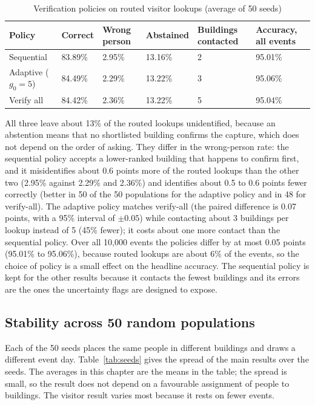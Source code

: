\documentclass[12pt,a4paper,oneside]{report}
\begin{document}
\begin{table}[htbp]
\centering
\caption{Verification policies on routed visitor lookups (average of 50 seeds)}\label{tab:policies}
{\small\setlength{\tabcolsep}{4pt}\renewcommand{\arraystretch}{1.2}
\begin{tabular}{|p{3.3cm}|p{1.9cm}|p{2.2cm}|p{2.0cm}|p{2.3cm}|p{2.2cm}|}\hline
\textbf{Policy} & \textbf{Correct} & \textbf{Wrong person} & \textbf{Abstained} & \textbf{Buildings contacted} & \textbf{Accuracy, all events}\\\hline
Sequential & 83.89\% & 2.95\% & 13.16\% & 2 & 95.01\%\\\hline
Adaptive ($g_0=5$) & 84.49\% & 2.29\% & 13.22\% & 3 & 95.06\%\\\hline
Verify all & 84.42\% & 2.36\% & 13.22\% & 5 & 95.04\%\\\hline
\end{tabular}}
\end{table}

All three leave about 13\% of the routed lookups unidentified, because an abstention means that no shortlisted building confirms the capture, which does not depend on the order of asking. They differ in the wrong-person rate: the sequential policy accepts a lower-ranked building that happens to confirm first, and it misidentifies about 0.6 points more of the routed lookups than the other two (2.95\% against 2.29\% and 2.36\%) and identifies about 0.5 to 0.6 points fewer correctly (better in 50 of the 50 populations for the adaptive policy and in 48 for verify-all). The adaptive policy matches verify-all (the paired difference is 0.07 points, with a 95\% interval of $\pm0.05$) while contacting about 3 buildings per lookup instead of 5 (45\% fewer); it costs about one more contact than the sequential policy. Over all 10,000 events the policies differ by at most 0.05 points (95.01\% to 95.06\%), because routed lookups are about 6\% of the events, so the choice of policy is a small effect on the headline accuracy. The sequential policy is kept for the other results because it contacts the fewest buildings and its errors are the ones the uncertainty flags are designed to expose.

\subsection{Stability across 50 random populations}\label{sec:res-seeds}
Each of the 50 seeds places the same people in different buildings and draws a different event day. Table~\ref{tab:seeds} gives the spread of the main results over the seeds. The averages in this chapter are the means in the table; the spread is small, so the result does not depend on a favourable assignment of people to buildings. The visitor result varies most because it rests on fewer events.
\end{document}
